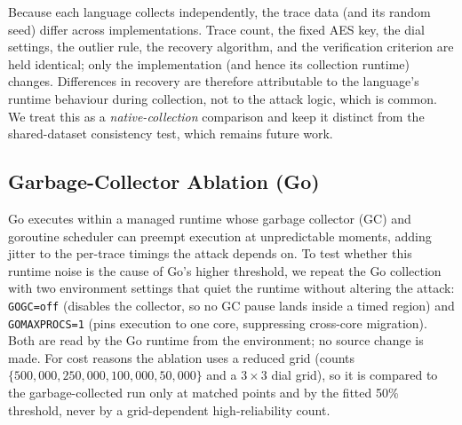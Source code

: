Because each language collects independently, the trace data (and its random
seed) differ across implementations. Trace count, the fixed AES key, the dial
settings, the outlier rule, the recovery algorithm, and the verification
criterion are held identical; only the implementation (and hence its collection
runtime) changes. Differences in recovery are therefore attributable to the
language's runtime behaviour during collection, not to the attack logic, which
is common. We treat this as a \emph{native-collection} comparison and keep it
distinct from the shared-dataset consistency test, which remains future work.

\subsection{Garbage-Collector Ablation (Go)}
\label{sec:method-gc}
Go executes within a managed runtime whose garbage collector (GC) and goroutine
scheduler can preempt execution at unpredictable moments, adding jitter to the
per-trace timings the attack depends on. To test whether this runtime noise is
the cause of Go's higher threshold, we repeat the Go collection with two
environment settings that quiet the runtime without altering the attack:
\texttt{GOGC=off} (disables the collector, so no GC pause lands inside a timed
region) and \texttt{GOMAXPROCS=1} (pins execution to one core, suppressing
cross-core migration). Both are read by the Go runtime from the environment; no
source change is made. For cost reasons the ablation uses a reduced grid (counts
$\{500{,}000, 250{,}000, 100{,}000, 50{,}000\}$ and a $3\times3$ dial grid), so
it is compared to the garbage-collected run only at matched points and by the
fitted 50\% threshold, never by a grid-dependent high-reliability count.

